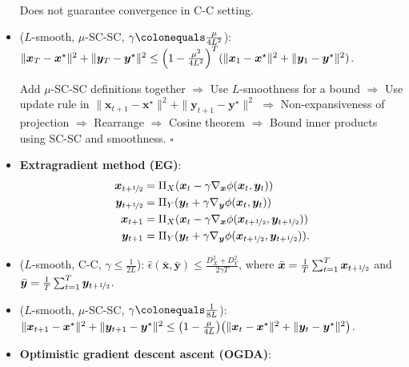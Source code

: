 \documentclass[8pt,a4paper]{extarticle}
\renewcommand{\proof}[1]{\begin{tcolorbox}#1 \hfill $\square$\end{tcolorbox}}
\newcommand{\lft}{\mathopen{}\mathclose\bgroup\left}
\newcommand{\rgt}{\aftergroup\egroup\right}
\renewcommand{\vec}[1]{\bm{#1}}
\newenvironment{topic}[1]
{\textbf{\sffamily \colorbox{black}{\rlap{\textbf{\textcolor{white}{#1}}}\hspace{\linewidth}\hspace{-2\fboxsep}}} \\ \vspace{0.2cm}}
{}
\begin{document}
\begin{multicols*}{2}
\begin{topic}{Min-max optimization}
\begin{itemize}
                  Does not guarantee convergence in C-C setting.
            \item ($L$-smooth, $\mu$-SC-SC, $\gamma \colonequals \frac{\mu}{4L^2}$): $\| \vec{x}_T - \vec{x}^\star \|^2 + \| \vec{y}_T - \vec{y}^\star \|^2 \leq \lft( 1 - \frac{\mu^2}{4L^2} \rgt)^T (\| \vec{x}_1 - \vec{x}^\star \|^2 + \| \vec{y}_1 - \vec{y}^\star \|^2)$.
                  \proof{Add $\mu$-SC-SC definitions together $\Rightarrow$ Use $L$-smoothness for a bound $\Rightarrow$ Use update rule in $\| \vec{x}_{t+1} - \vec{x}^\star \|^2 + \| \vec{y}_{t+1} - \vec{y}^\star \|^2$ $\Rightarrow$ Non-expansiveness of projection $\Rightarrow$ Rearrange $\Rightarrow$ Cosine theorem $\Rightarrow$ Bound inner products using SC-SC and smoothness.}
            \item \textbf{Extragradient method (EG)}:
                  \begin{align*}
                      \vec{x}_{t+\nicefrac{1}{2}} & = \Pi_X(\vec{x}_t - \gamma \nabla_{\vec{x}} \phi(\vec{x}_t, \vec{y}_t))                                      \\
                      \vec{y}_{t+\nicefrac{1}{2}} & = \Pi_Y(\vec{y}_t + \gamma \nabla_{\vec{y}} \phi(\vec{x}_t, \vec{y}_t))                                      \\
                      \vec{x}_{t+1}               & = \Pi_X(\vec{x}_t - \gamma \nabla_{\vec{x}} \phi(\vec{x}_{t+\nicefrac{1}{2}}, \vec{y}_{t+\nicefrac{1}{2}}))  \\
                      \vec{y}_{t+1}               & = \Pi_Y(\vec{y}_t + \gamma \nabla_{\vec{y}} \phi(\vec{x}_{t+\nicefrac{1}{2}}, \vec{y}_{t+\nicefrac{1}{2}})).
                  \end{align*}
            \item ($L$-smooth, C-C, $\gamma \leq \frac{1}{2L}$): $\hat{\epsilon}(\bar{\vec{x}}, \bar{\vec{y}}) \leq \frac{D_X^2 + D_Y^2}{2 \gamma T}$, where $\bar{\vec{x}} = \frac{1}{T} \sum_{t=1}^{T} \vec{x}_{t+\nicefrac{1}{2}}$ and $\bar{\vec{y}} = \frac{1}{T} \sum_{t=1}^{T} \vec{y}_{t+\nicefrac{1}{2}}$.
            \item ($L$-smooth, $\mu$-SC-SC, $\gamma \colonequals \frac{1}{8L}$): $\| \vec{x}_{t+1} - \vec{x}^\star \|^2 + \| \vec{y}_{t+1} - \vec{y}^\star \|^2 \leq \lft( 1 - \frac{\mu}{4L} \rgt) \lft( \| \vec{x}_t - \vec{x}^\star \|^2 + \| \vec{y}_t - \vec{y}^\star \|^2 \rgt)$.
            \item \textbf{Optimistic gradient descent ascent (OGDA)}:
                  \begin{align*}

\end{align*}
\end{itemize}
\end{topic}
\end{multicols*}
\end{document}
